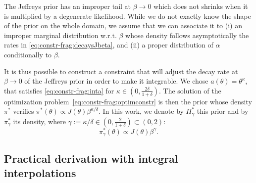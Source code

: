The Jeffreys prior has an improper tail at $\beta\to0$ which does not shrinks when it is multiplied by a degenerate likelihood.
While we do not exactly know the shape of the prior on the whole domain, we assume that we can associate it to (i) an improper marginal distribution w.r.t. $\beta$ whose density follows asymptotically the rates in \cref{eq:constr-frag:decaysJbeta}, and (ii) a proper distribution of $\alpha$ conditionally to $\beta$.



It is thus possible to construct a constraint that will adjust the decay rate at $\beta\to0$ of the Jeffreys prior in order to make it integrable.
We chose $a(\theta)=\theta^\kappa$, that satisfies \cref{eq:constr-frag:inta} for $\kappa\in(0,\frac{2\delta}{1+\delta})$. 
The solution of the optimization problem~\eqref{eq:constr-frag:optimconstr} is then the prior whose density $\pi^\ast$ verifies $\pi^\ast(\theta)\propto J(\theta)\beta^{\kappa/\delta}$. In this work, we denote by $\varPi^\ast_\gamma$ this prior and by $\pi^\ast_\gamma$ its density, where $\gamma:=\kappa/\delta\in(0,\frac{2}{1+\delta})\subset(0,2)$:
    \begin{equation}
        \pi^\ast_\gamma(\theta) \propto J(\theta)\beta^\gamma.
    \end{equation}













\subsection{Practical derivation with integral interpolations}\label{sec:constr-frags:subsec-practical-interpol}


